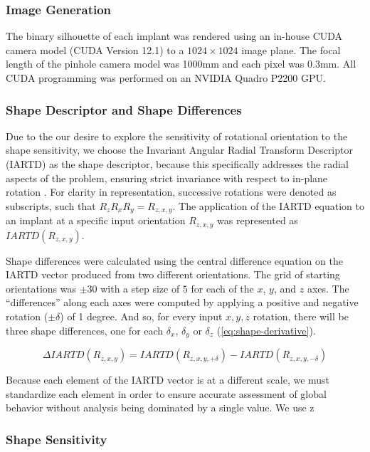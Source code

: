 \subsubsection{Image Generation}
The binary silhouette of each implant was rendered using an in-house CUDA camera model (CUDA Version 12.1) \cite{nickollsScalableParallelProgramming2008} to a $1024\times 1024$ image plane.
The focal length of the pinhole camera model was 1000mm and each pixel was 0.3mm.
All CUDA programming was performed on an NVIDIA Quadro P2200 GPU.
\subsubsection{Shape Descriptor and Shape Differences}
Due to the our desire to explore the sensitivity of rotational orientation to the shape sensitivity, we choose the Invariant Angular Radial Transform Descriptor (IARTD) as the shape descriptor, because this specifically addresses the radial aspects of the problem, ensuring strict invariance with respect to in-plane rotation \cite{leeNewShapeDescription2012}.
For clarity in representation, successive rotations were denoted as subscripts, such that $R_{z}R_{x}R_{y} = R_{z,x,y}$. The application of the IARTD equation to an implant at a specific input orientation $R_{z,x,y}$ was represented as $IARTD(R_{z,x,y})$.

Shape differences were calculated using the central difference equation on the IARTD vector produced from two different orientations.
The grid of starting orientations was $\pm 30$ with a step size of $5$ for each of the $x$, $y$, and $z$ axes.
The ``differences'' along each axes were computed by applying a positive and negative rotation ($\pm \delta $) of 1 degree.
And so, for every input $x,y,z$ rotation, there will be three shape differences, one for each $\delta_{x}$, $\delta_{y}$ or $\delta_{z}$ (\cref{eq:shape-derivative}).



\begin{equation}
  \label{eq:shape-derivative}
    \Delta IARTD(R_{z,x,y}) = IARTD(R_{z,x,y,+\delta}) - IARTD(R_{z,x,y,-\delta})
\end{equation}

Because each element of the IARTD vector is at a different scale, we must standardize each element in order to ensure accurate assessment of global behavior without analysis being dominated by a single value.
We use z

\subsubsection{Shape Sensitivity}


